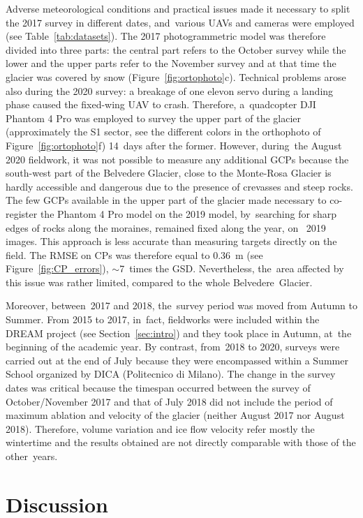 Adverse meteorological conditions and practical issues made it necessary to split the 2017 survey in different dates, and~various UAVs and cameras were employed (see Table~\ref{tab:datasets}).
The 2017 photogrammetric model was therefore divided into three parts: the central part refers to the October survey while the lower and the upper parts refer to the November survey and at that time the glacier was covered by snow (Figure~\ref{fig:ortophoto}c).
Technical problems arose also during the 2020 survey: a breakage of one elevon servo during a landing phase caused the fixed-wing UAV to crash. 
Therefore, a~quadcopter DJI Phantom 4 Pro was employed to survey the upper part of the glacier (approximately the S1 sector, see the different colors in the orthophoto of Figure~\ref{fig:ortophoto}f) \SI{14}{days} after the former.
However, during~the August 2020 fieldwork, it was not possible to measure any additional GCPs because the south-west part of the Belvedere Glacier, close to the Monte-Rosa Glacier is hardly accessible and dangerous due to the presence of crevasses and steep rocks.
The few GCPs available in the upper part of the glacier made necessary to co-register the Phantom 4 Pro model on the 2019 model, by~searching for sharp edges of rocks along the moraines, remained fixed along the year, on~ 2019 images. 
This approach is less accurate than measuring targets directly on the field.
The RMSE on CPs was therefore equal to \SI{0.36}{\meter} (see Figure~\ref{fig:CP_errors}), $\sim$7~times the GSD.
Nevertheless, the~area affected by this issue was rather limited, compared to the whole Belvedere~Glacier.

Moreover, between~2017 and 2018, the~survey period was moved from Autumn to Summer. 
From 2015 to 2017, in~fact, fieldworks were included within the DREAM project (see Section~\ref{sec:intro}) and they took place in Autumn, at~the beginning of the academic year.
By contrast, from~2018 to 2020, surveys were carried out at the end of July because they were encompassed within a Summer School organized by DICA (Politecnico di Milano).
The change in the survey dates was critical because the timespan occurred between the survey of October/November 2017 and that of July 2018 did not include the period of maximum ablation and velocity of the glacier (neither August 2017 nor August 2018). 
Therefore, volume variation and ice flow velocity refer mostly the wintertime and the results obtained are not directly comparable with those of the other~years.

\section{Discussion}

